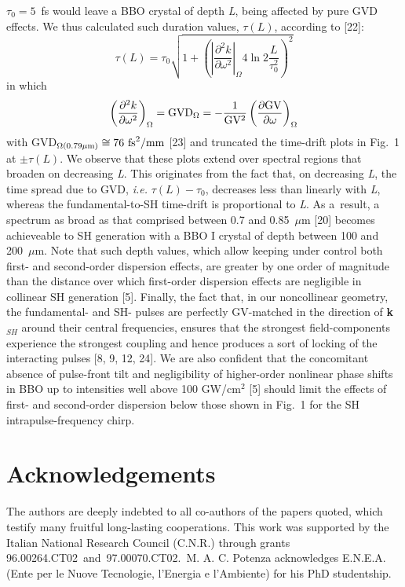 \documentclass[times]{jtitauth}
\begin{document}
$\tau_0 = 5$~fs would leave a BBO crystal of depth {\it L}, being
affected by pure GVD effects. We thus calculated such duration
values, $\tau (L)$, according to [22]:
\begin{equation}
\tau (L) = \tau_0 \sqrt{1 + \left( \left|\frac{\partial^2
k}{\partial\omega^2} \right|_\Omega 4\ln 2 \frac
{L}{\tau_0^2}\right)^2}
\end{equation}
\noindent in which
\begin{equation}
\left(\frac{\partial^2 k}{\partial \omega^2}\right)_\Omega = {\rm
GVD}_\Omega = - \frac 1 {\rm GV^2}\left(\frac{\partial {\rm
GV}}{\partial\omega} \right)_\Omega
\end{equation}
with GVD$_{\Omega (0.79 \mu{\rm m)}} \cong 76~{\rm fs}^2/{\rm mm}$
[23] and truncated the time-drift plots in Fig.~1 at $\pm\tau(L)$.
We observe that these plots extend over spectral regions that
broaden on decreasing {\it L}. This originates from the fact that,
on decreasing {\it L}, the time spread due to GVD, {\it i.e.}
$\tau(L) - \tau_0$, decreases less than linearly with {\it L},
whereas the fundamental-to-SH time-drift is proportional to {\it
L}. As a~result, a spectrum as broad as that comprised between 0.7
and 0.85~$\mu$m [20] becomes achieveable to SH generation with a
BBO I crystal of depth between 100 and 200~$\mu$m. Note that such
depth values, which allow keeping under control both first- and
second-order dispersion effects, are greater by one order of
magnitude than the distance over which first-order dispersion
effects are negligible in collinear SH generation [5]. Finally,
the fact that, in our noncollinear geometry, the fundamental- and
SH- pulses are perfectly GV-matched in the direction of {\bf
k}$_{SH}$ around their central frequencies, ensures that the
strongest field-components experience the strongest coupling and
hence produces a sort of locking of the interacting pulses [8, 9,
12, 24]. We are also confident that the concomitant absence of
pulse-front tilt and negligibility of higher-order nonlinear phase
shifts in BBO up to intensities well above 100 GW/cm$^2$ [5]
should limit the effects of first- and second-order dispersion
below those shown in Fig.~1 for the SH intrapulse-frequency chirp.


\section*{Acknowledgements}

The authors are deeply indebted to all co-authors of the papers
quoted, which testify many fruitful long-lasting cooperations.
This work was supported by the Italian National Research Council
(C.N.R.) through grants 96.00264.CT02~and~97.00070.CT02.~M. A. C.
Potenza acknowledges E.N.E.A. (Ente per le Nuove Tecnologie,
l'Energia e l'Ambiente) for his PhD studentship.
\end{document}
